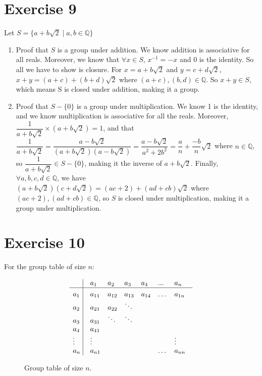 \documentclass[12pt]{article}
\newcommand{\Q}{\mathbb{Q}}
\begin{document}
    \section*{Exercise 9}
    Let $S = \{a + b\sqrt{2} \mid a, b \in \Q\}$
    \begin{enumerate}[label=\textbf{\alph*.}]
        \item 
            Proof that $S$ is a group under addition.
            We know addition is associative for all reals.
            Moreover, we know that $\forall x \in S$, $x^{-1} = -x$
            and 0 is the identity.
            So all we have to show is closure.
            For $x = a + b\sqrt{2}$ and $y = c + d\sqrt{2}$,
            $x + y = (a + c) + (b + d)\sqrt{2}$
            where $(a + c), (b, d) \in \Q$.
            So $x + y \in S$,
            which means S is closed under addition, making it a group. 
        \item
            Proof that $S - \{0\}$ is a group under multiplication.
            We know 1 is the identity,
            and we know multiplication is associative for all the reals.
            Moreover, $\dfrac{1}{a + b\sqrt{2}} \times (a + b\sqrt{2}) = 1$,
            and that $\dfrac{1}{a + b\sqrt{2}}
            = \dfrac{a - b\sqrt{2}}{(a + b\sqrt{2})(a - b\sqrt{2})}
            = \dfrac{a - b\sqrt{2}}{a^{2} + 2b^{2}}
            = \dfrac{a}{n} + \dfrac{-b}{n}\sqrt{2}$
            where $n \in \Q$,
            so $\dfrac{1}{a + b\sqrt{2}} \in S - \{0\}$,
            making it the inverse of $a + b\sqrt{2}$.
            Finally, $\forall a, b, c, d \in \Q$,
            we have $(a + b\sqrt{2})(c + d\sqrt{2})
            = (ac + 2) + (ad + cb)\sqrt{2}$
            where $(ac + 2), (ad + cb) \in \Q$,
            so $S$ is closed under multiplication,
            making it a group under multiplication.
    \end{enumerate}


    \section*{Exercise 10}
    For the group table of size $n$:

    \begin{figure}[H]
        \centering

        \[\vbox{\tabskip0.5em\offinterlineskip
        \halign{\strut$#$\hfil\ \tabskip1em\vrule&&$#$\hfil\cr
        ~   & a_1   & a_2   & a_3 & a_4   & ...   & a_n   \cr
        \noalign{\hrule}\vrule height 12pt width 0pt
        a_1   & a_{11}   & a_{12}   & a_{13} & a_{14} & \dots & a_{1n} \cr
        a_2   & a_{21}   & a_{22} & \ddots \cr
        a_3   & a_{31}   & \ddots & \ddots \cr
        a_4   & a_{41} \cr
        \vdots & \vdots & & & & & \vdots \cr
        a_n   & a_{n1} & & & & \dots & a_{nn} \cr
        }}\]

        \caption{\label{fig:figure1} Group table of size $n$.}
    \end{figure}
\end{document}
